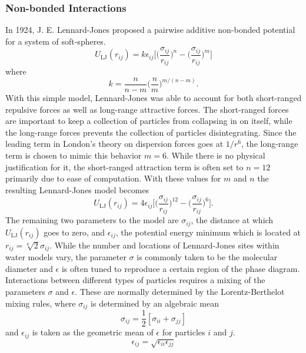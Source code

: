 \subsubsection{Non-bonded Interactions}
In 1924, J. E. Lennard-Jones proposed a pairwise additive
non-bonded potential for a system of soft-spheres.
\begin{equation}\label{eq:LJ}
U_{\mathrm{LJ}}(r_{ij}) = k\epsilon_{ij}\Bigg[ \Big( \frac{\sigma_{ij}}{r_{ij}}\Big)^n - \Big(\frac{\sigma_{ij}}{r_{ij}}\Big)^m\Bigg]
\end{equation}
where
\begin{equation}\label{eq:LJ2}
k = \frac{n}{n-m} \Big(\frac{n}{m}\Big)^{m/(n-m)}.
\end{equation}
With this simple model, Lennard-Jones was able to account for both
short-ranged repulsive forces as well as long-range attractive
forces. The short-ranged forces are important to keep a collection of
particles from collapsing in on itself, while the long-range forces
prevents the collection of particles disintegrating. Since the leading
term in London's theory on dispersion forces goes at $1/r^6$, the
long-range term is chosen to mimic this behavior $m=6$. While there is
no physical justification for it, the short-ranged attraction term is
often set to $n=12$ primarily due to ease of computation. With these
values for $m$ and $n$ the resulting Lennard-Jones model becomes
\begin{equation}\label{eq:LJ3}
U_{\mathrm{LJ}}(r_{ij}) =
4\epsilon_{ij}\Bigg[\Big(\frac{\sigma_{ij}}{r_{ij}}\Big)^{12}-\Big(\frac{\sigma_{ij}}{r_{ij}}\Big)^{6}\Bigg].
\end{equation} 
The remaining two parameters to the model are $\sigma_{ij}$, the distance
at which $U_{\mathrm{LJ}}(r_{ij})$ goes to zero, and $\epsilon_{ij}$, the potential
energy minimum which is located at $r_{ij} = \sqrt[6]{2}\sigma_{ij}$. While the
number and locations of Lennard-Jones sites within water models vary,
the parameter $\sigma$ is commonly taken to be the molecular diameter
and $\epsilon$ is often tuned to reproduce a certain region of the
phase diagram. Interactions between different types of particles
requires a mixing of the parameters $\sigma$ and $\epsilon$. These are
normally determined by the Lorentz-Berthelot mixing rules, where
$\sigma_{ij}$ is determined by an algebraic mean 
\begin{equation}\label{eq:sigma}
\sigma_{ij} = \frac{1}{2} [\sigma_{ii} + \sigma_{jj}]
\end{equation}
and $\epsilon_{ij}$ is taken as the geometric mean of $\epsilon$ for
particles $i$ and $j$. \cite{Lorentz1881,Berthelot1898}
\begin{equation}\label{eq:epsilon}
\epsilon_{ij} = \sqrt{\epsilon_{ii}\epsilon_{jj}}
\end{equation}


